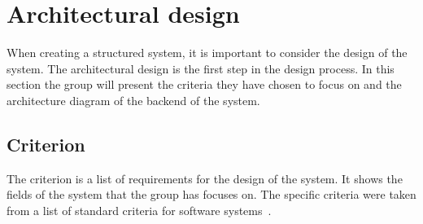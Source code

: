 \section{Architectural design}\label{sec:architectural-design}

When creating a structured system, it is important to consider the design of the system.
The architectural design is the first step in the design process.
In this section the group will present the criteria they have chosen to focus on and the architecture diagram of the
backend of the system.

\subsection{Criterion}\label{subsec:criterion}

The criterion is a list of requirements for the design of the system.
It shows the fields of the system that the group has focuses on.
The specific criteria were taken from a list of standard criteria for software systems~\cite[180]{mathiassen2018}. 

\begin{table}[H]
    \centering
\end{table}

